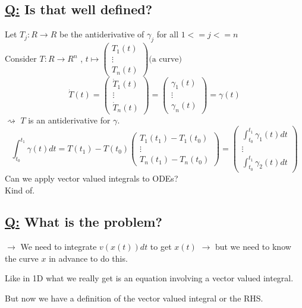 \documentclass[a4paper, 12pt]{article}
\begin{document}
\subsection{\underline{Q:} Is that well defined?}
Let $T_j : R \rightarrow R$ be the antiderivative of $\gamma_j$ for all $ 1 <= j <= n$\\
Consider $T : R \rightarrow R^n$ , $t \mapsto  \begin{pmatrix} T_1 (t)\\ \vdots \\ T_n (t) \end{pmatrix} \text{(a curve)}$
$$ \dot{T} (t) = \begin{pmatrix} \dot{T}_1 (t)\\ \vdots \\ \dot{T}_n (t) \end{pmatrix} =  \begin{pmatrix} \gamma_1 (t)\\ \vdots \\ \gamma_n (t) \end{pmatrix} = \gamma(t)$$
$\rightsquigarrow$ $T$ is an antiderivative for $\gamma$.
$$\int_{t_0}^{t_1} \gamma (t) dt = T(t_1) - T(t_0) \begin{pmatrix} T_1(t_1) - T_1(t_0) \\ \vdots \\ T_n(t_1) - T_n(t_0) \end{pmatrix} = \begin{pmatrix} \int_{t_0}^{t_1} \gamma_1 (t) dt \\ \vdots \\ \int_{t_0}^{t_1} \gamma_2 (t) dt \end{pmatrix}$$
Can we apply vector valued integrals to ODEs?\\
Kind of.
\subsection{\underline{Q:} What is the problem?}
$\rightarrow$ We need to integrate $v(x(t))dt$ to get $x(t)$
$\rightarrow$ but we need to know the curve $x$ in advance to do this.
\begin{tikzpicture}
\end{tikzpicture}
Like in 1D what we really get is an equation involving a vector valued integral.
\begin{tikzpicture}
\end{tikzpicture}
But now we have a definition of the vector valued integral or the RHS.
\end{document}
